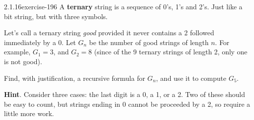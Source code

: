 \documentclass[twoside,11pt,]{book}
\newcommand{\terminology}[1]{\textbf{#1}}
\numberwithin{equation}{chapter}
\begin{document}
\begin{divisionsolution}{2.1.16}{}{exercise-196}%
\hypertarget{p-3046}{}%
A \terminology{ternary} string is a sequence of 0's, 1's and 2's.  Just like a bit string, but with three symbols.%
\par
\hypertarget{p-3047}{}%
Let's call a ternary string \emph{good} provided it never contains a 2 followed immediately by a 0.  Let \(G_n\) be the number of good strings of length \(n\).  For example, \(G_1 = 3\), and \(G_2 = 8\) (since of the 9 ternary strings of length 2, only one is not good).%
\par
\hypertarget{p-3048}{}%
Find, with justification, a recursive formula for \(G_n\), and use it to compute \(G_5\).%
\par\smallskip%
\noindent\textbf{Hint}.\quad%
\hypertarget{p-3049}{}%
Consider three cases: the last digit is a 0, a 1, or a 2.  Two of these should be easy to count, but strings ending in 0 cannot be proceeded by a 2, so require a little more work.%
\end{divisionsolution}%
\end{document}
